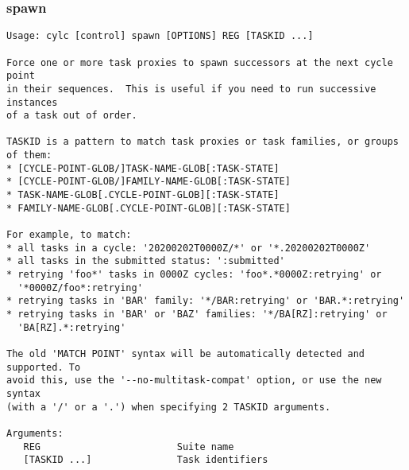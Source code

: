 \subsubsection{spawn}
\label{spawn}
\begin{lstlisting}
Usage: cylc [control] spawn [OPTIONS] REG [TASKID ...] 

Force one or more task proxies to spawn successors at the next cycle point
in their sequences.  This is useful if you need to run successive instances
of a task out of order.

TASKID is a pattern to match task proxies or task families, or groups of them:
* [CYCLE-POINT-GLOB/]TASK-NAME-GLOB[:TASK-STATE]
* [CYCLE-POINT-GLOB/]FAMILY-NAME-GLOB[:TASK-STATE]
* TASK-NAME-GLOB[.CYCLE-POINT-GLOB][:TASK-STATE]
* FAMILY-NAME-GLOB[.CYCLE-POINT-GLOB][:TASK-STATE]

For example, to match:
* all tasks in a cycle: '20200202T0000Z/*' or '*.20200202T0000Z'
* all tasks in the submitted status: ':submitted'
* retrying 'foo*' tasks in 0000Z cycles: 'foo*.*0000Z:retrying' or
  '*0000Z/foo*:retrying'
* retrying tasks in 'BAR' family: '*/BAR:retrying' or 'BAR.*:retrying'
* retrying tasks in 'BAR' or 'BAZ' families: '*/BA[RZ]:retrying' or
  'BA[RZ].*:retrying'

The old 'MATCH POINT' syntax will be automatically detected and supported. To
avoid this, use the '--no-multitask-compat' option, or use the new syntax
(with a '/' or a '.') when specifying 2 TASKID arguments.

Arguments:
   REG                        Suite name
   [TASKID ...]               Task identifiers


\end{lstlisting}
